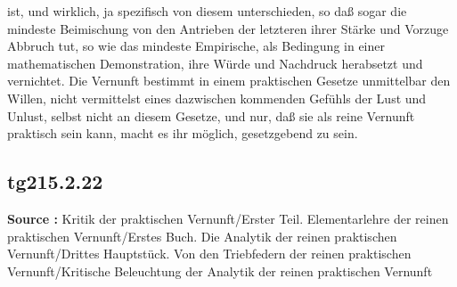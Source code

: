 \documentclass[a4paper,12pt,twoside]{book}
\begin{document}
ist, und wirklich, ja spezifisch von diesem unterschieden, so daß sogar die mindeste Beimischung von den Antrieben der letzteren ihrer Stärke und Vorzuge Abbruch tut, so wie das mindeste Empirische, als Bedingung in einer mathematischen Demonstration, ihre Würde und Nachdruck herabsetzt und vernichtet. Die Vernunft bestimmt in einem praktischen Gesetze unmittelbar  den Willen, nicht vermittelst eines dazwischen kommenden Gefühls der Lust und Unlust, selbst nicht an diesem Gesetze, und nur, daß sie als reine Vernunft praktisch sein kann, macht es ihr möglich, gesetzgebend zu sein. 
	
	\subsection*{tg215.2.22} 
	\textbf{Source : }Kritik der praktischen Vernunft/Erster Teil. Elementarlehre der reinen praktischen Vernunft/Erstes Buch. Die Analytik der reinen praktischen Vernunft/Drittes Hauptstück. Von den Triebfedern der reinen praktischen Vernunft/Kritische Beleuchtung der Analytik der reinen praktischen Vernunft\\  
	
\end{document}
